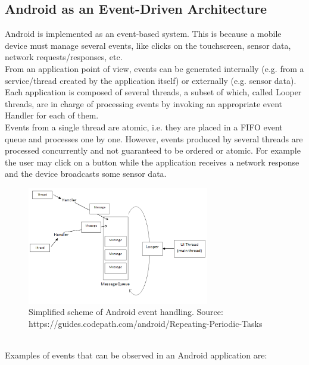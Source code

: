 \documentclass[11pt,a4paper,notitlepage]{article}
\begin{document}
\subsection{Android as an Event-Driven Architecture}
Android is implemented as an event-based system. This is because a mobile device must manage several events, like clicks on the touchscreen, sensor data, network requests/responses, etc.\bigskip \\
From an application point of view, events can be generated internally (e.g. from a service/thread created by the application itself) or externally (e.g. sensor data). Each application is composed of several threads, a subset of which, called Looper threads, are in charge of processing events by invoking an appropriate event Handler for each of them.\medskip \\
Events from a single thread are atomic, i.e. they are placed in a FIFO event queue and processes one by one. However, events produced by several threads are processed concurrently and not guaranteed to be ordered or atomic. For example the user may click on a button while the application receives a network response and the device broadcasts some sensor data.\medskip \\
\begin{figure}
  \centering
  \includegraphics[width=300px]{Images/Android/event-driven.png}
  \caption[Android event handling]{Simplified scheme of Android event handling. Source: https://guides.codepath.com/android/Repeating-Periodic-Tasks}
\end{figure}\\
Examples of events that can be observed in an Android application are:
\end{document}
